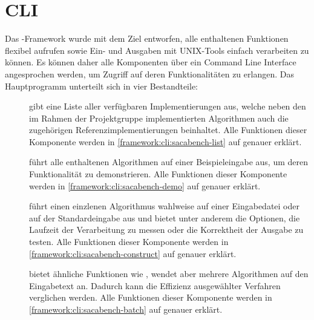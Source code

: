 \section{CLI}

Das  \sacabench-Framework wurde mit dem Ziel entworfen, alle enthaltenen Funktionen flexibel aufrufen sowie Ein- und Ausgaben mit UNIX-Tools einfach verarbeiten zu können.
Es können daher alle Komponenten über ein Command Line Interface angesprochen werden, um Zugriff auf deren Funktionalitäten zu erlangen.
Das Hauptprogramm unterteilt sich in vier Bestandteile:
\begin{description}
    \item[] gibt eine Liste aller verfügbaren Implementierungen aus, welche neben den im Rahmen der Projektgruppe implementierten Algorithmen auch die zugehörigen Referenzimplementierungen beinhaltet.
        Alle Funktionen dieser Komponente werden in \cref{framework:cli:sacabench-list} auf  genauer erklärt.
    \item[] führt alle enthaltenen Algorithmen auf einer Beispieleingabe aus, um deren Funktionalität zu demonstrieren.
        Alle Funktionen dieser Komponente werden in \cref{framework:cli:sacabench-demo} auf  genauer erklärt.
    \item[] führt einen einzlenen Algorithmus wahlweise auf einer Eingabedatei oder auf der Standardeingabe aus und bietet unter anderem die Optionen, die Laufzeit der Verarbeitung zu messen oder die Korrektheit der Ausgabe zu testen. Alle Funktionen dieser Komponente werden in \cref{framework:cli:sacabench-construct} auf  genauer erklärt.
    \item[] bietet ähnliche Funktionen wie , wendet aber mehrere Algorithmen auf den Eingabetext an. Dadurch kann die Effizienz ausgewählter Verfahren verglichen werden. Alle Funktionen dieser Komponente werden in \cref{framework:cli:sacabench-batch} auf  genauer erklärt.
\end{description}






